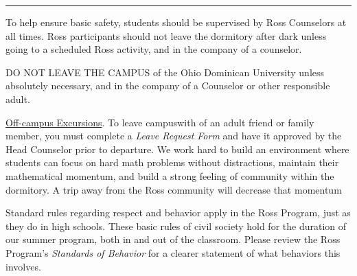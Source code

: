 \documentclass{ross}
\begin{document}
\bigskip\hrule
\pagebreak

To help ensure basic safety, students should be supervised 
by Ross Counselors at all times.
Ross participants should not leave the dormitory after dark unless going to a
scheduled Ross activity, and in the company of a counselor.

DO NOT LEAVE THE CAMPUS of the Ohio Dominican University unless \\
absolutely necessary, and in the company of a Counselor or other responsible adult.  

\underline{Off-campus Excursions}.  To leave campuswith
of an adult friend or family member, you must complete a {\it Leave Request Form} 
and have it approved by the Head Counselor prior to departure.
We work hard to build an environment where students can focus on hard math problems
without distractions, maintain their mathematical momentum,
 and build a strong feeling of community within the dormitory.  
 A trip away from the Ross community will decrease that momentum

\bigskip

Standard rules regarding respect and behavior apply in the Ross
Program, just as they do in high schools. These basic rules of civil society hold 
for the duration of our summer program, both in and out of the classroom. 
Please review the Ross Program's \textit{Standards of Behavior} for
a clearer statement of what behaviors this involves.
\end{document}
